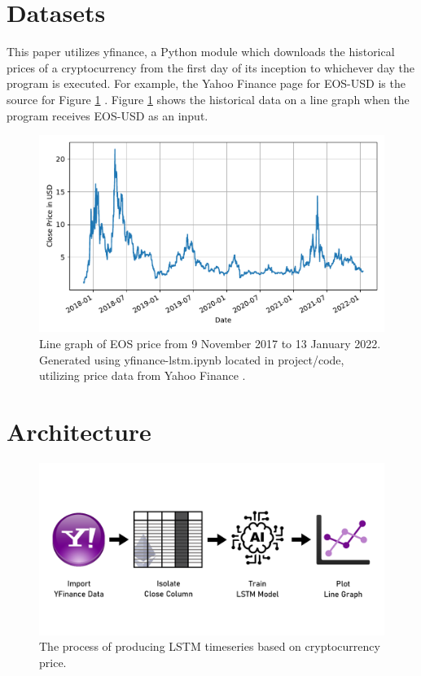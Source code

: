 \section{Datasets}

This paper utilizes yfinance, a Python module which downloads the historical prices of a cryptocurrency from the first day of its inception to whichever day the program is executed. For example, the Yahoo Finance page for EOS-USD is the source for Figure \ref{fig:eos-price} \cite{c4}. Figure \ref{fig:eos-price} shows the historical data on a line graph when the program receives EOS-USD as an input.

\begin{figure}[htb]
\includegraphics[width=\columnwidth]{images/EOS-USD-price.pdf}
\caption{Line graph of EOS price from 9 November 2017 to 13 January 2022. Generated using yfinance-lstm.ipynb \cite{c13} located in project/code, utilizing price data from Yahoo Finance \cite{c4}.}
\label{fig:eos-price}
\end{figure}

\section{Architecture}

\begin{figure}[htb]
\includegraphics[width=\columnwidth]{images/architecture-process.png}
\caption{The process of producing LSTM timeseries based on cryptocurrency price.}
\label{fig:arch-process}
\end{figure}

